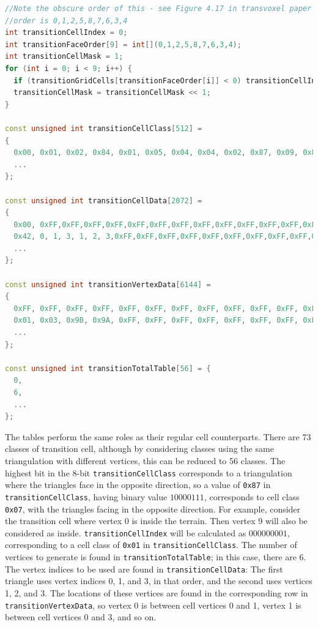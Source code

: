\documentclass[11pt]{article}
\begin{document}
\begin{lstlisting}[language=C++, label={tv_transition_tables}, caption={Calculation of \texttt{transitionCellIndex}, and lookup tables for transition cells. An example of their usage is given below.}]
//Note the obscure order of this - see Figure 4.17 in transvoxel paper
//order is 0,1,2,5,8,7,6,3,4
int transitionCellIndex = 0;
int transitionFaceOrder[9] = int[](0,1,2,5,8,7,6,3,4);
int transitionCellMask = 1;
for (int i = 0; i < 9; i++) {
  if (transitionGridCells[transitionFaceOrder[i]] < 0) transitionCellIndex |= transitionCellMask;
  transitionCellMask = transitionCellMask << 1;
}

const unsigned int transitionCellClass[512] =
{
  0x00, 0x01, 0x02, 0x84, 0x01, 0x05, 0x04, 0x04, 0x02, 0x87, 0x09, 0x8C, 0x84, 0x0B, 0x05, 0x05,
  ...
};

const unsigned int transitionCellData[2072] =
{
  0x00, 0xFF,0xFF,0xFF,0xFF,0xFF,0xFF,0xFF,0xFF,0xFF,0xFF,0xFF,0xFF,0xFF,0xFF,0xFF,0xFF,0xFF,0xFF,0xFF,0xFF,0xFF,0xFF,0xFF,0xFF,0xFF,0xFF,0xFF,0xFF,0xFF,0xFF,0xFF,0xFF,0xFF,0xFF,0xFF,0xFF,
  0x42, 0, 1, 3, 1, 2, 3,0xFF,0xFF,0xFF,0xFF,0xFF,0xFF,0xFF,0xFF,0xFF,0xFF,0xFF,0xFF,0xFF,0xFF,0xFF,0xFF,0xFF,0xFF,0xFF,0xFF,0xFF,0xFF,0xFF,0xFF,0xFF,0xFF,0xFF,0xFF,0xFF,0xFF,
  ...
};

const unsigned int transitionVertexData[6144] =
{
  0xFF, 0xFF, 0xFF, 0xFF, 0xFF, 0xFF, 0xFF, 0xFF, 0xFF, 0xFF, 0xFF, 0xFF,
  0x01, 0x03, 0x9B, 0x9A, 0xFF, 0xFF, 0xFF, 0xFF, 0xFF, 0xFF, 0xFF, 0xFF,
  ...
};

const unsigned int transitionTotalTable[56] = {
  0,
  6,
  ...
};       
\end{lstlisting}

The tables perform the same roles as their regular cell counterparts. There are 73 classes of transition cell, although by considering classes using the same triangulation with different vertices, this can be reduced to 56 classes. The highest bit in the 8-bit \texttt{transitionCellClass} corresponds to a triangulation where the triangles face in the opposite direction, so a value of \texttt{0x87} in \texttt{transitionCellClass}, having binary value $10000111$, corresponds to cell class \texttt{0x07}, with the triangles facing in the opposite direction. 
For example, consider the transition cell where vertex 0 is inside the terrain. Then vertex 9 will also be considered as inside. \texttt{transitionCellIndex} will be calculated as $000000001$, corresponding to a cell class of \texttt{0x01} in \texttt{transitionCellClass}. 
The number of vertices to generate is found in \texttt{transitionTotalTable}; in this case, there are 6. The vertex indices to be used are found in \texttt{transitionCellData}: The first triangle uses vertex indices 0, 1, and 3, in that order, and the second uses vertices 1, 2, and 3.
The locations of these vertices are found in the corresponding row in \texttt{transitionVertexData}, so vertex 0 is between cell vertices 0 and 1, vertex 1 is between cell vertices 0 and 3, and so on.
\end{document}
